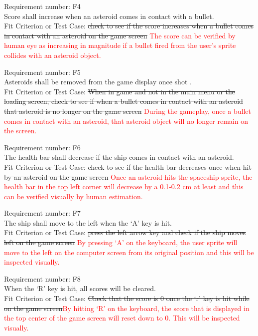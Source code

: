 \documentclass[12pt, titlepage]{article}
\begin{document}
\noindent Requirement number: F4
\\Score shall increase when an asteroid comes in contact with a bullet.
\\Fit Criterion or Test Case: \sout{check to see if the score increases when a bullet comes in contact with an asteroid on the game screen}
\textcolor{red}{The score can be verified by human eye as increasing in magnitude if a bullet fired from the user's sprite collides with an asteroid object.}
\bigskip

\noindent Requirement number: F5
\\Asteroids shall be removed from the game display once shot .
\\Fit Criterion or Test Case: \sout{When in game and not in the main menu or the loading screen, check to see if when a bullet comes in contact with an asteroid that asteroid is no longer on the game screen}
\textcolor{red}{During the gameplay, once a bullet comes in contact with an asteroid, that asteroid object will no longer remain on the screen.}
\bigskip

\noindent Requirement number: F6
\\The health bar shall decrease if the ship comes in contact with an asteroid.
\\Fit Criterion or Test Case: \sout{ check to see if the health bar decreases once when hit by an asteroid on the game screen}
\textcolor{red}{Once an asteroid hits the spaceship sprite, the health bar in the top left corner will decrease by a 0.1-0.2 cm at least and this can be verified visually by human estimation.}
\bigskip

\noindent Requirement number: F7
\\The ship shall move to the left when the `A' key is hit.
\\Fit Criterion or Test Case: \sout{press the left arrow key and check if the ship moves left on the game screen}
\textcolor{red}{By pressing `A' on the keyboard, the user sprite will move to the left on the computer screen from its original position and this will be inspected visually.}
\bigskip

\noindent Requirement number: F8
\\When the `R' key is hit, all scores will be cleared.
\\Fit Criterion or Test Case: \sout{Check that the score is 0 once the `r' key is hit while on the game screen}\textcolor{red}{By hitting `R' on the keyboard, the score that is displayed in the top center of the game screen will reset down to 0. This will be inspected visually. }
\bigskip
\end{document}

